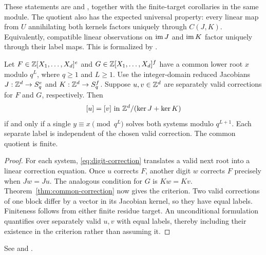These statements are
 and
, together with the
finite-target corollaries in the same module. The quotient also has the
expected universal property: every linear map from $U$ annihilating both
kernels factors uniquely through $C(J,K)$. Equivalently, compatible linear
observations on $\operatorname{im} J$ and $\operatorname{im} K$ factor uniquely through their label
maps. This is formalized by
.

\begin{corollary}\label{cor:shared-polynomial}
Let $F\in\mathbb Z[X_1,\ldots,X_d]^e$ and
$G\in\mathbb Z[X_1,\ldots,X_d]^f$ have a common lower root $x$ modulo $q^L$,
where $q\ge1$ and $L\ge1$. Use the integer-domain reduced Jacobians
$J:\mathbb Z^d\to S_q^e$ and $K:\mathbb Z^d\to S_q^f$. Suppose $u,v\in\mathbb Z^d$ are
separately valid corrections for $F$ and $G$, respectively. Then
\[
 [u]=[v]\text{ in }\mathbb Z^d/(\ker J+\ker K)
\]
if and only if a single $y\equiv x\pmod{q^L}$ solves both systems modulo
$q^{L+1}$. Each separate label is independent of the chosen valid
correction. The common quotient is finite.
\end{corollary}

\begin{proof}
For each system, \eqref{eq:digit-correction} translates a valid next root
into a linear correction equation. Once $u$ corrects $F$, another digit
$w$ corrects $F$ precisely when $Jw=Ju$. The analogous condition for $G$
is $Kw=Kv$. Theorem~\ref{thm:common-correction} now gives the criterion.
Two valid corrections of one block differ by a vector in its Jacobian
kernel, so they have equal labels. Finiteness follows from either finite
residue target. An unconditional formulation quantifies over separately
valid $u,v$ with equal labels, thereby including their existence in the
criterion rather than assuming it.
\end{proof}

See  and
.

